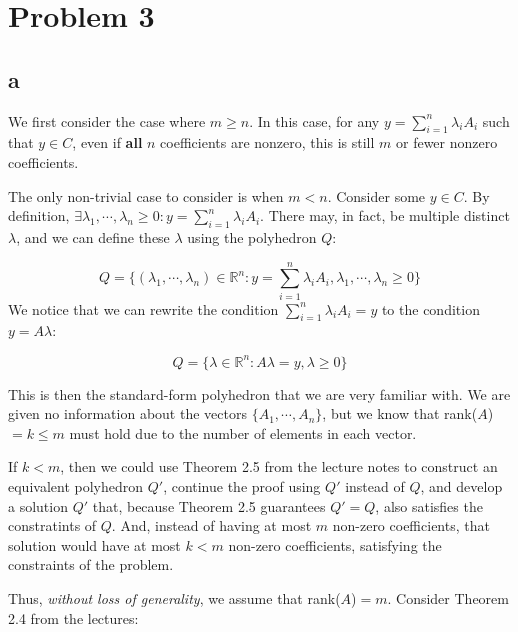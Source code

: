 \documentclass[11pt]{article}
\begin{document}
\section*{Problem 3}
\subsection*{a}

We first consider the case where $m\geq n$. In this case, for any $y=\sum_{i=1}^n\lambda_iA_i$ such that $y\in C$, even if \textbf{all} $n$ coefficients are nonzero, this is still $m$ or fewer nonzero coefficients.

The only non-trivial case to consider is when $m<n$. Consider some $y\in C$. By definition, $\exists \lambda_1, \cdots, \lambda_n\geq 0:y=\sum_{i=1}^n\lambda_i A_i$. There may, in fact, be multiple distinct $\lambda$, and we can define these $\lambda$ using the polyhedron $Q$:

$$
Q=\bigl\{(\lambda_1, \cdots,\lambda_n)\in\mathbb{R}^n:y=\sum_{i=1}^n\lambda_iA_i, \lambda_1, \cdots, \lambda_n \geq 0\bigr\}
$$
We notice that we can rewrite the condition $\sum_{i=1}^n\lambda_iA_i=y$ to the condition $y=A\lambda$:

$$
Q=\bigl\{\lambda\in\mathbb{R}^n:A\lambda=y, \lambda\geq 0\bigr\}
$$

This is then the standard-form polyhedron that we are very familiar with. We are given no information about the vectors $\{A_1,\cdots, A_n\}$, but we know that rank($A$)$=k\leq m$ must hold due to the number of elements in each vector. 

If $k<m$, then we could use Theorem 2.5 from the lecture notes to construct an equivalent polyhedron $Q'$, continue the proof using $Q'$ instead of $Q$, and develop a solution $Q'$ that, because Theorem 2.5 guarantees $Q'=Q$, also satisfies the constratints of $Q$. And, instead of having at most $m$ non-zero coefficients, that solution would have at most $k<m$ non-zero coefficients, satisfying the constraints of the problem. 

Thus, \emph{without loss of generality}, we assume that rank($A$)$=m$. Consider Theorem 2.4 from the lectures:

\bigskip

\noindent{}
\end{document}

